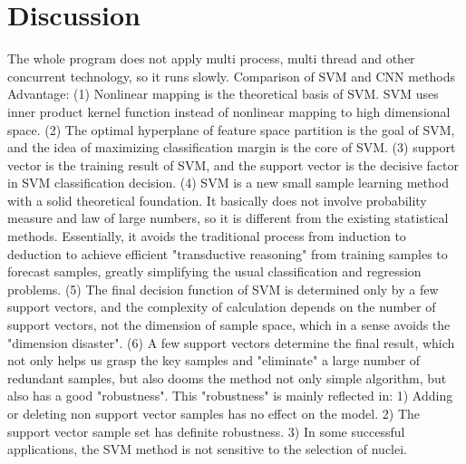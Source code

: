 \documentclass[12pt]{report}
\begin{document}
\chapter{Discussion}
The whole program does not apply multi process, multi thread and other concurrent technology, so it runs slowly.
Comparison of SVM and CNN methods
Advantage:
 (1) Nonlinear mapping is the theoretical basis of SVM. SVM uses inner product kernel function instead of nonlinear mapping to high dimensional space.
 (2) The optimal hyperplane of feature space partition is the goal of SVM, and the idea of maximizing classification margin is the core of SVM.
 (3) support vector is the training result of SVM, and the support vector is the decisive factor in SVM classification decision.
 (4) SVM is a new small sample learning method with a solid theoretical foundation. It basically does not involve probability measure and law of large numbers, so it is different from the existing statistical methods. Essentially, it avoids the traditional process from induction to deduction to achieve efficient "transductive reasoning" from training samples to forecast samples, greatly simplifying the usual classification and regression problems.
 (5) The final decision function of SVM is determined only by a few support vectors, and the complexity of calculation depends on the number of support vectors, not the dimension of sample space, which in a sense avoids the "dimension disaster".
 (6) A few support vectors determine the final result, which not only helps us grasp the key samples and "eliminate" a large number of redundant samples, but also dooms the method not only simple algorithm, but also has a good "robustness". This "robustness" is mainly reflected in:
  1) Adding or deleting non support vector samples has no effect on the model.
  2) The support vector sample set has definite robustness.
  3) In some successful applications, the SVM method is not sensitive to the selection of nuclei.
\end{document}
